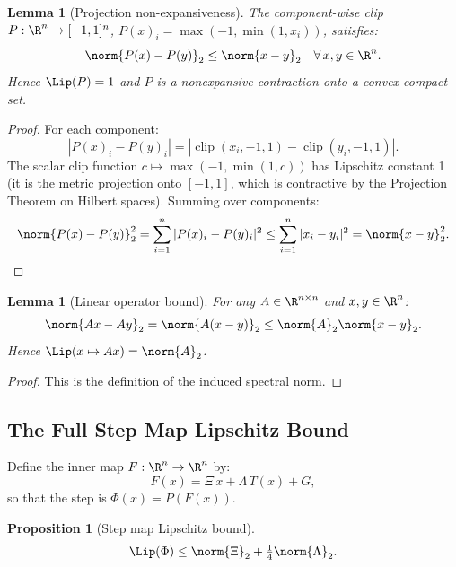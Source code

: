 \documentclass[11pt,letterpaper]{article}
\newtheorem{lemma}[theorem]{Lemma}
\newtheorem{proposition}[theorem]{Proposition}
\theoremstyle{remark}
\begin{document}
\begin{lemma}[Projection non-expansiveness]
\label{lem:proj-nonexp}
The component-wise clip $P : \R^n \to [-1,1]^n$,
$P(x)_i = \max(-1,\min(1,x_i))$, satisfies:
\[
  \norm{P(x) - P(y)}_2 \leq \norm{x-y}_2 \quad \forall\, x, y \in \R^n.
\]
Hence $\Lip(P) = 1$ and $P$ is a nonexpansive contraction onto a
convex compact set.
\end{lemma}

\begin{proof}
For each component:
\[
  |P(x)_i - P(y)_i| = |\operatorname{clip}(x_i,-1,1) - \operatorname{clip}(y_i,-1,1)|.
\]
The scalar clip function $c \mapsto \max(-1,\min(1,c))$ has Lipschitz
constant 1 (it is the metric projection onto $[-1,1]$, which is
contractive by the Projection Theorem on Hilbert spaces). Summing
over components:
\[
  \norm{P(x)-P(y)}_2^2 = \sum_{i=1}^n |P(x)_i - P(y)_i|^2
  \leq \sum_{i=1}^n |x_i - y_i|^2 = \norm{x-y}_2^2. \qedhere
\]
\end{proof}

\begin{lemma}[Linear operator bound]
\label{lem:linear}
For any $A \in \R^{n \times n}$ and $x, y \in \R^n$:
\[
  \norm{Ax - Ay}_2 = \norm{A(x-y)}_2 \leq \norm{A}_2 \norm{x-y}_2.
\]
Hence $\Lip(x \mapsto Ax) = \norm{A}_2$.
\end{lemma}

\begin{proof}
This is the definition of the induced spectral norm.
\end{proof}

\subsection{The Full Step Map Lipschitz Bound}

Define the inner map $F : \R^n \to \R^n$ by:
\[
  F(x) = \Xi\, x + \Lambda\, T(x) + G,
\]
so that the step is $\Phi(x) = P(F(x))$.

\begin{proposition}[Step map Lipschitz bound]
\label{prop:step-lip}
\[
  \Lip(\Phi) \leq \norm{\Xi}_2 + \tfrac{1}{4}\norm{\Lambda}_2.
\]
\end{proposition}
\end{document}
